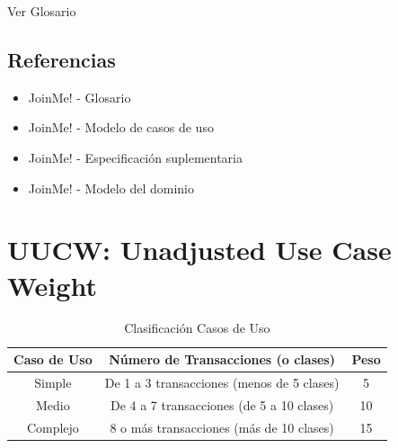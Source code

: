 \documentclass[12pt, a4paper, titlepage]{article}
\begin{document}
Ver Glosario

\subsection{Referencias}

\begin{itemize}

    \item JoinMe! - Glosario
    \item JoinMe! - Modelo de casos de uso
    \item JoinMe! - Especificación suplementaria
    \item JoinMe! - Modelo del dominio
\end{itemize}

\section{UUCW: Unadjusted Use Case Weight}

\begin{table}[h]
	\begin{center}
		\begin{tabular}{|c|c|c|}
	\hline
	Caso de Uso & Número de Transacciones (o clases) & Peso \\ \hline
	Simple & De 1 a 3 transacciones (menos de 5 clases) & 5 \\ \hline
	Medio & De 4 a 7 transacciones (de 5 a 10 clases) & 10 \\ \hline
	Complejo & 8 o más transacciones (más de 10 clases) & 15 \\ \hline
	
	\end{tabular}
	\caption{Clasificación Casos de Uso}
	\end{center}
\end{table}
\end{document}
